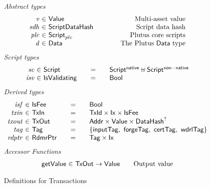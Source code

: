 \begin{figure*}[htb]
  \emph{Abstract types}
  \begin{equation*}
    \begin{array}{r@{~\in~}l@{\quad\quad\quad\quad}r}
      \var{v} &\Value & \text{Multi-asset value}\\
      \var{sdh} &\ScriptDataHash & \text{Script data hash}\\
      \var{plc} & \ScriptPlutus & \text{Plutus core scripts} \\
      \var{d} & \Data & \text{The Plutus $\Data$ type}
    \end{array}
  \end{equation*}
  \emph{Script types}
  \begin{equation*}
    \begin{array}{r@{~\in~}l@{\qquad=\qquad}lr}
      \var{sc} & \Script & \ScriptNative \uniondistinct \ScriptNonNative \\
      \var{isv} & \IsValidating & \Bool
    \end{array}
  \end{equation*}
%
  \emph{Derived types}
  \begin{equation*}
    \begin{array}{r@{~\in~}l@{\qquad=\qquad}lr}
      \var{isf}
      & \IsFee
      & \Bool
      \\
      \var{txin}
      & \TxIn
      & \TxId \times \Ix \times \IsFee
      \\
      \var{txout}
      & \TxOut
      & \Addr \times \Value \times \DataHash^?
      \\
      \var{tag}
      & \Tag
      & \{\mathsf{inputTag},~\mathsf{forgeTag},~\mathsf{certTag},~\mathsf{wdrlTag}\}
      \\
      \var{rdptr}
      & \RdmrPtr
      & \Tag \times \Ix
    \end{array}
  \end{equation*}
  \emph{Accessor Functions}
  \begin{equation*}
    \begin{array}{r@{~\in~}l@{\qquad}l}
      \fun{getValue} & \TxOut \to \Value & \text{Output value}
    \end{array}
  \end{equation*}
  \caption{Definitions for Transactions}
  \label{fig:defs:utxo-shelley-1}
\end{figure*}


